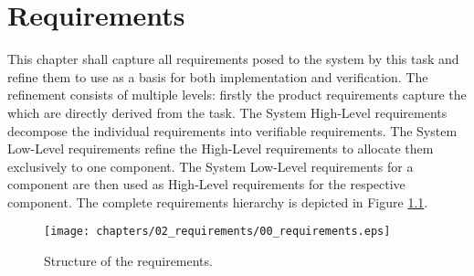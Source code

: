 \chapter{Requirements}
This chapter shall capture all requirements posed to the
system by this task and refine them to use as a basis for
both implementation and verification.
The refinement consists of multiple levels:
firstly the product requirements capture the which are directly
derived from the task. The System High-Level requirements
decompose the individual requirements into verifiable
requirements. The System Low-Level requirements refine the 
High-Level requirements to allocate them exclusively to one
component. The System Low-Level requirements for a component
are then used as High-Level requirements for the respective
component. The complete requirements hierarchy is depicted
in Figure \ref{fig:reqStructure}.

\begin{figure}[H]
    \centering
    \texttt{[image: chapters/02\_requirements/00\_requirements.eps]}
    \caption{Structure of the requirements.} 
    \label{fig:reqStructure}
\end{figure}

\newpage



